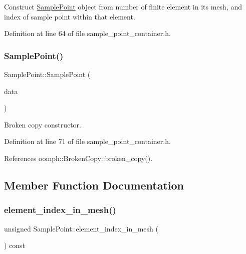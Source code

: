 Construct \hyperlink{classSamplePoint}{Sample\+Point} object from number of finite element in its mesh, and index of sample point within that element. 



Definition at line 64 of file sample\+\_\+point\+\_\+container.\+h.

\mbox{\label{classSamplePoint_a69b61d9a3a217af33a58a703a295d1da}} 
\subsubsection{\texorpdfstring{Sample\+Point()}{SamplePoint()}\hspace{0.1cm}{\footnotesize\ttfamily [2/2]}}
{\footnotesize\ttfamily Sample\+Point\+::\+Sample\+Point (\begin{DoxyParamCaption}\item[{const \hyperlink{classSamplePoint}{Sample\+Point} \&}]{data }\end{DoxyParamCaption})\hspace{0.3cm}{\ttfamily [inline]}}



Broken copy constructor. 



Definition at line 71 of file sample\+\_\+point\+\_\+container.\+h.



References oomph\+::\+Broken\+Copy\+::broken\+\_\+copy().



\subsection{Member Function Documentation}
\mbox{\label{classSamplePoint_a57f59cddbb9ef2e3100588cf2eacba5c}} 
\subsubsection{\texorpdfstring{element\+\_\+index\+\_\+in\+\_\+mesh()}{element\_index\_in\_mesh()}}
{\footnotesize\ttfamily unsigned Sample\+Point\+::element\+\_\+index\+\_\+in\+\_\+mesh (\begin{DoxyParamCaption}{ }\end{DoxyParamCaption}) const\hspace{0.3cm}{\ttfamily [inline]}}



